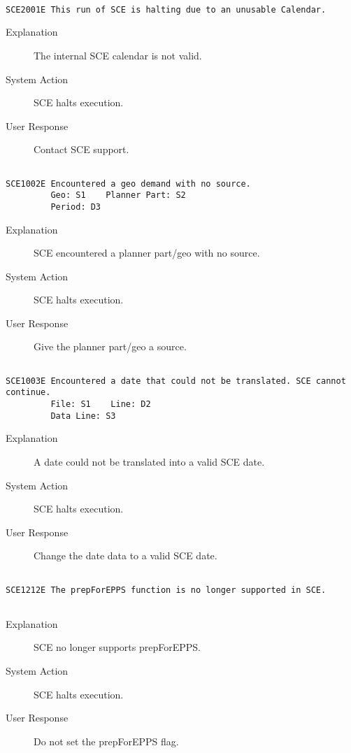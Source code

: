 \hrulefill
\begin{verbatim}

SCE2001E This run of SCE is halting due to an unusable Calendar.
\end{verbatim}
\begin{description}
\item[Explanation]  The internal SCE calendar is not valid.

\item[System Action]  SCE halts execution.

\item[User Response]  Contact SCE support.
\end{description}
\hrulefill
\begin{verbatim}

SCE1002E Encountered a geo demand with no source.
         Geo: S1    Planner Part: S2
         Period: D3
\end{verbatim}
\begin{description}
\item[Explanation]  SCE encountered a planner part/geo with no source.

\item[System Action]  SCE halts execution.

\item[User Response]  Give the planner part/geo a source.
\end{description}
\hrulefill
\begin{verbatim}

SCE1003E Encountered a date that could not be translated. SCE cannot continue.
         File: S1    Line: D2
         Data Line: S3
\end{verbatim}
\begin{description}
\item[Explanation]  A date could not be translated into a valid SCE date.

\item[System Action]  SCE halts execution.

\item[User Response]  Change the date data to a valid SCE date.
\end{description}
\hrulefill
\begin{verbatim}

SCE1212E The prepForEPPS function is no longer supported in SCE.
         
\end{verbatim}
\begin{description}
\item[Explanation]  SCE no longer supports prepForEPPS.

\item[System Action]  SCE halts execution.

\item[User Response]  Do not set the prepForEPPS flag.
\end{description}
\hrulefill

 
